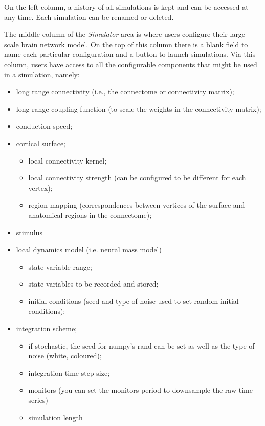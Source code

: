 		On the left column, a history of all simulations is kept and can be 
		accessed at any time. Each simulation can be renamed or deleted.

		The middle column of the \emph{Simulator} area is where users configure their
		large-scale brain network model. On the top of this column there is a blank
		field to name each particular configuration and a button to launch simulations.
		Via this column, users have access to all the configurable components that might
		be used in a simulation, namely:

		{\small

		\begin{itemize}
			\item long range connectivity (i.e., the connectome or connectivity matrix);
			\item long range coupling function (to scale the weights in the connectivity matrix);
			\item conduction speed;
			\item cortical surface;
			\begin{itemize}
				\item local connectivity kernel;
				\item local connectivity strength (can be configured to be different for each vertex);
				\item region mapping (correspondences between vertices of the surface and anatomical regions in the connectome);
			\end{itemize}
			\item stimulus
			\item local dynamics model (i.e. neural mass model)
				\begin{itemize}
					\item state variable range;
					\item state variables to be recorded and stored;
					\item initial conditions (seed and type of noise used to set random initial conditions);
				\end{itemize}
			\item integration scheme;
			\begin{itemize}
				\item if stochastic, the seed for numpy's rand can be set as well as the type of noise (white, coloured);
				\item integration time step size;
			\item monitors (you can set the monitors period to downsample the raw time-series)
			\item simulation length
			\end{itemize}
		\end{itemize}
		}

